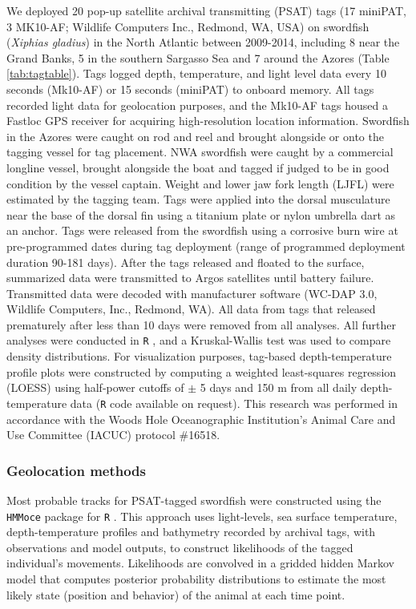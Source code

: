 We deployed 20 pop-up satellite archival transmitting (PSAT) tags (17 miniPAT, 3 MK10-AF; Wildlife Computers Inc., Redmond, WA, USA) on swordfish (\textit{Xiphias gladius}) in the North Atlantic between 2009-2014, including 8 near the Grand Banks, 5 in the southern Sargasso Sea and 7 around the Azores (Table \ref{tab:tagtable}). Tags logged depth, temperature, and light level data every 10 seconds (Mk10-AF) or 15 seconds (miniPAT) to onboard memory. All tags recorded light data for geolocation purposes, and the Mk10-AF tags housed a Fastloc GPS receiver for acquiring high-resolution location information. Swordfish in the Azores were caught on rod and reel and brought alongside or onto the tagging vessel for tag placement. NWA swordfish were caught by a commercial longline vessel, brought alongside the boat and tagged if judged to be in good condition by the vessel captain. Weight and lower jaw fork length (LJFL) were estimated by the tagging team. Tags were applied into the dorsal musculature near the base of the dorsal fin using a titanium plate or nylon umbrella dart as an anchor. Tags were released from the swordfish using a corrosive burn wire at pre-programmed dates during tag deployment (range of programmed deployment duration 90-181 days). After the tags released and floated to the surface, summarized data were transmitted to Argos satellites until battery failure. Transmitted data were decoded with manufacturer software (WC-DAP 3.0, Wildlife Computers, Inc., Redmond, WA). All data from tags that released prematurely after less than 10 days were removed from all analyses. All further analyses were conducted in \texttt{R} \citep{RDevelopmentCoreTeam2015}, and a Kruskal-Wallis test was used to compare density distributions. For visualization purposes, tag-based depth-temperature profile plots were constructed by computing a weighted least-squares regression (LOESS) using half-power cutoffs of $\pm$ 5 days and 150 m from all daily depth-temperature data (\texttt{R} code available on request). This research was performed in accordance with the Woods Hole Oceanographic Institution's Animal Care and Use Committee (IACUC) protocol \#16518.

\subsubsection{Geolocation methods}

Most probable tracks for PSAT-tagged swordfish were constructed using the \texttt{HMMoce} package \citep[][Chp. \ref{chap:2}]{Braun2018a} for \texttt{R} \citep{RDevelopmentCoreTeam2015}. This approach uses light-levels, sea surface temperature, depth-temperature profiles and bathymetry recorded by archival tags, with observations and model outputs, to construct likelihoods of the tagged individual's movements. Likelihoods are convolved in a gridded hidden Markov model that computes posterior probability distributions to estimate the most likely state (position and behavior) of the animal at each time point.

